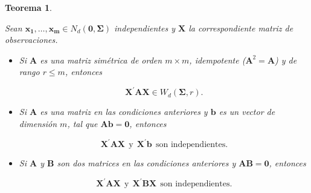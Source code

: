 \documentclass[
  a4paper,
  oneside]{scrbook}
\newtheorem{theorem}{Teorema}[chapter]
\theoremstyle{definition}
\theoremstyle{definition}
\theoremstyle{definition}
\theoremstyle{definition}
\theoremstyle{remark}
\begin{document}
\begin{theorem}
\protect\hypertarget{thm:tc2}{}\label{thm:tc2}

Sean
\(\bm{x_1},\ldots,\bm{x_m}\in N_d(\bm{0},\bm\Sigma)\) independientes y
\(\bm{X}\) la correspondiente matriz de observaciones.

\begin{itemize}
\item
  Si \(\bm{A}\) es una matriz simétrica de orden \(m\times m\),
  idempotente (\(\bm{A}^2=\bm{A}\)) y de rango \(r\leq m\), entonces

  \[\bm{X}^\prime{}\bm{A}\bm{X}\in W_d(\bm\Sigma,r).\]
\item
  Si \(\bm{A}\) es una matriz en las condiciones anteriores y \(\bm{b}\)
  es un vector de dimensión \(m\), tal que \(\bm{A}\bm{b}=\bm{0}\),
  entonces

  \[\bm{X}^\prime{}\bm{A}\bm{X}\ \ \mbox{y}\ \  \bm{X}^\prime{}\bm{b}\ \ \mbox{son independientes}.\]
\item
  Si \(\bm{A}\) y \(\bm{B}\) son dos matrices en las condiciones
  anteriores y \(\bm{A}\bm{B}=\bm{0}\), entonces

  \[\bm{X}^\prime{}\bm{A}\bm{X}\ \ \mbox{y}\ \  \bm{X}^\prime{}\bm{B}\bm{X}\ \  \mbox{son independientes}.\]
\end{itemize}

\end{theorem}
\end{document}
